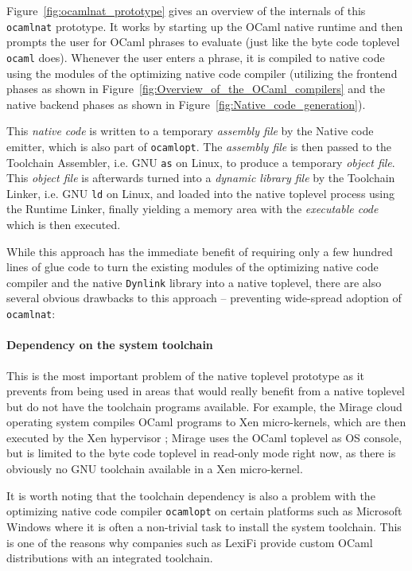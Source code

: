 \documentclass[10pt,a4paper,draft,twocolumn]{article}
\makeatletter
\newcommand{\ie}{i.e.\@\xspace}
\makeatother
\begin{document}
Figure~\ref{fig:ocamlnat_prototype} gives an overview of the internals of this \texttt{ocamlnat} prototype.
It works by starting up the OCaml native runtime and then prompts the user for OCaml phrases to evaluate
(just like the byte code toplevel \texttt{ocaml} does). Whenever the user enters a phrase, it is compiled
to native code using the modules of the optimizing native code compiler (utilizing the frontend phases as
shown in Figure~\ref{fig:Overview_of_the_OCaml_compilers} and the native backend phases as shown in
Figure~\ref{fig:Native_code_generation}).

This \emph{native code} is written to a temporary \emph{assembly file} by the Native code emitter, which
is also part of \texttt{ocamlopt}. The \emph{assembly file} is then passed to the Toolchain Assembler, \ie GNU
\texttt{as} on Linux, to produce a temporary \emph{object file}. This \emph{object file} is afterwards turned
into a \emph{dynamic library file} by the Toolchain Linker, \ie GNU \texttt{ld} on Linux, and loaded into the
native toplevel process using the Runtime Linker, finally yielding a memory area with the \emph{executable code}
which is then executed.

While this approach has the immediate benefit of requiring only a few hundred lines of glue code to turn
the existing modules of the optimizing native code compiler and the native \texttt{Dynlink} library into
a native toplevel, there are also several obvious drawbacks to this approach -- preventing wide-spread
adoption of \texttt{ocamlnat}:

\paragraph{Dependency on the system toolchain}

This is the most important problem of the native toplevel prototype as it prevents from being
used in areas that would really benefit from a native toplevel but do not have the toolchain programs
available. For example, the Mirage cloud operating system \cite{Mirage11,Madhavapeddy10,Madhavapeddy10hotcloud}
compiles OCaml programs to Xen micro-kernels, which are then executed by the Xen hypervisor \cite{Xen11}; Mirage uses
the OCaml toplevel as OS console, but is limited to the byte code toplevel in read-only mode right now, as
there is obviously no GNU toolchain available in a Xen micro-kernel.

It is worth noting that the toolchain dependency is also a problem with the optimizing native code compiler
\texttt{ocamlopt} on certain platforms such as Microsoft Windows where it is often a non-trivial task to
install the system toolchain. This is one of the reasons why companies such as LexiFi provide custom OCaml
distributions with an integrated toolchain.
\end{document}
